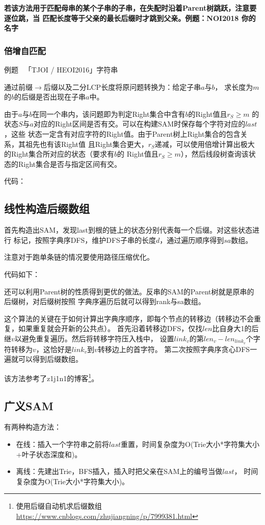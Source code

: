 {\bfseries 若该方法用于匹配母串的某个子串的子串，在失配时沿着Parent树跳跃，注意要逐位跳，当
匹配长度等于父亲的最长后缀时才跳到父亲。例题：NOI2018 你的名字}
\subsubsection{倍增自匹配}
例题~ 「TJOI / HEOI2016」字符串

通过前缀$\rightarrow$后缀以及二分LCP长度将原问题转换为：给定子串$a$与$b$，
求长度为$m$的$b$的后缀是否出现在子串$a$中。

由于$a$与$b$在同一个串内，该问题即为判定Right集合中含有$b$的Right值且$r_S\geq m$
的状态$S$与$a$对应的Right区间是否有交。可以在构建SAM时保存每个字符对应的$last$，这些
状态一定含有对应字符的Right值。由于Parent树上Right集合的包含关系，其祖先也有该Right值
且Right集合更大，$r_S$递减，可以使用倍增计算出极大的Right集合所对应的状态（要求有$b$的
Right值且$r_S\geq m$），然后线段树查询该状态的Right集合是否与指定区间有交。

代码：

\subsection{线性构造后缀数组}
首先构造出SAM，发现last到根的链上的状态分别代表每一个后缀。对这些状态进行
标记，按照字典序DFS，维护DFS子串的长度$d$，通过遍历顺序得到$sa$数组。

注意对于跑单条链的情况要使用路径压缩优化。

代码如下：


还可以利用Parent树的性质得到更优的做法。反串的SAM的Parent树就是原串的后缀树，对后缀树按照
字典序遍历后就可以得到rank与sa数组。

这个算法的关键在于如何计算出字典序顺序，即每个节点的转移边（转移边不会重复，如果重复就会开新的公共点）。
首先沿着转移边DFS，仅找$len$比自身大1的后继$v$以避免重复遍历。然后将转移字符压入栈中，
设置$link_v$的第$len_v-len_{link_v}$个字符转移为$v$，这恰好是$link_v$到$v$转移边上的首字符。
第二次按照字典序贪心DFS一遍就可以得到后缀数组。

该方法参考了z1j1n1的博客\footnote{
    使用后缀自动机求后缀数组\\
    \url{https://www.cnblogs.com/zhujiangning/p/7999381.html}
}。
\subsection{广义SAM}
有两种构造方法：
\begin{itemize}
    \item 在线：插入一个字符串之前将$last$重置，时间复杂度为O(Trie大小*字符集大小
    +叶子状态深度和)。
    \item 离线：先建出Trie，BFS插入，插入时把父亲在SAM上的编号当做$last$，
    时间复杂度为O(Trie大小*字符集大小)。
\end{itemize}

